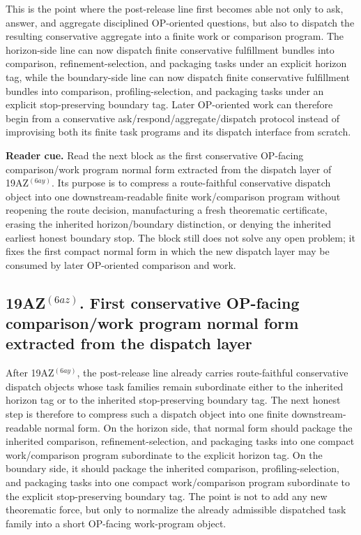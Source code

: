 \begin{remark}
\label{rem:what-the-first-conservative-resolution-to-task-dispatch-layer-now-buys}
This is the point where the post-release line first becomes able not only to ask, answer, and aggregate disciplined OP-oriented questions, but also to dispatch the resulting conservative aggregate into a finite work or comparison program. The horizon-side line can now dispatch finite conservative fulfillment bundles into comparison, refinement-selection, and packaging tasks under an explicit horizon tag, while the boundary-side line can now dispatch finite conservative fulfillment bundles into comparison, profiling-selection, and packaging tasks under an explicit stop-preserving boundary tag. Later OP-oriented work can therefore begin from a conservative ask/respond/aggregate/dispatch protocol instead of improvising both its finite task programs and its dispatch interface from scratch.
\end{remark}


\noindent\textbf{Reader cue.} Read the next block as the first conservative OP-facing comparison/work program normal form extracted from the dispatch layer of 19AZ$^{(6ay)}$. Its purpose is to compress a route-faithful conservative dispatch object into one downstream-readable finite work/comparison program without reopening the route decision, manufacturing a fresh theorematic certificate, erasing the inherited horizon/boundary distinction, or denying the inherited earliest honest boundary stop. The block still does not solve any open problem; it fixes the first compact normal form in which the new dispatch layer may be consumed by later OP-oriented comparison and work.

\subsection*{19AZ$^{(6az)}$. First conservative OP-facing comparison/work program normal form extracted from the dispatch layer}
\label{sec:first-conservative-op-facing-comparison-work-program-normal-form-extracted-from-the-dispatch-layer}
After 19AZ$^{(6ay)}$, the post-release line already carries route-faithful conservative dispatch objects whose task families remain subordinate either to the inherited horizon tag or to the inherited stop-preserving boundary tag. The next honest step is therefore to compress such a dispatch object into one finite downstream-readable normal form. On the horizon side, that normal form should package the inherited comparison, refinement-selection, and packaging tasks into one compact work/comparison program subordinate to the explicit horizon tag. On the boundary side, it should package the inherited comparison, profiling-selection, and packaging tasks into one compact work/comparison program subordinate to the explicit stop-preserving boundary tag. The point is not to add any new theorematic force, but only to normalize the already admissible dispatched task family into a short OP-facing work-program object.

